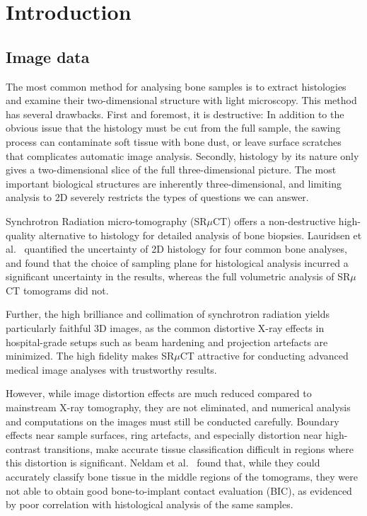\section{Introduction}
\label{sec:intro}


\subsection{Image data}

The most common method for analysing bone samples is to extract histologies and examine their
two-dimensional structure with light microscopy. This method has several drawbacks. First and
foremost, it is destructive: In addition to the obvious issue that the histology must be cut
from the full sample, the sawing process can contaminate soft tissue with bone dust, or leave
surface scratches that complicates automatic image analysis. Secondly, histology by its nature
only gives a two-dimensional slice of the full three-dimensional picture. The most important
biological structures are inherently three-dimensional, and limiting analysis to 2D severely
restricts the types of questions we can answer.

Synchrotron Radiation micro-tomography (SR$\mu$CT) offers a non-destructive high-quality
alternative to histology for detailed analysis of bone biopsies. Lauridsen et al.~\cite{torsten2018}
quantified the uncertainty of 2D histology for four common bone analyses, and found that the
choice of sampling plane for histological analysis incurred a significant uncertainty in the
results, whereas the full volumetric analysis of SR$\mu$CT tomograms did not.

Further, the high brilliance and collimation of synchrotron radiation yields particularly
faithful 3D images, as the common distortive X-ray effects in hospital-grade setups such
as beam hardening and projection artefacts are minimized. The high fidelity makes SR$\mu$CT
attractive for conducting advanced medical image analyses with trustworthy results.

However, while image distortion effects are much reduced compared to mainstream X-ray tomography,
they are not eliminated, and numerical analysis and computations on the images must still be
conducted carefully. Boundary effects near sample surfaces, ring artefacts, and especially
distortion near high-contrast transitions, make accurate tissue classification difficult in
regions where this distortion is significant. Neldam et al.~\cite{sporring} found that, while
they could accurately classify bone tissue in the middle regions of the tomograms, they were
not able to obtain good bone-to-implant contact evaluation (BIC), as evidenced by poor correlation
with histological analysis of the same samples.

